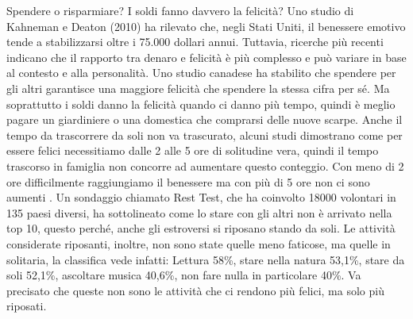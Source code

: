 \documentclass[12pt]{book} %
\begin{document}
\begin{mdframed}[linewidth=1pt]
Spendere o risparmiare? I soldi fanno davvero la felicità? Uno studio di Kahneman e Deaton (2010) ha rilevato che, negli Stati Uniti, il benessere emotivo tende a stabilizzarsi oltre i 75.000 dollari annui. Tuttavia, ricerche più recenti indicano che il rapporto tra denaro e felicità è più complesso e può variare in base al contesto e alla personalità. Uno studio canadese ha stabilito che spendere per gli altri
garantisce una maggiore felicità che spendere la stessa cifra per sé. 
Ma soprattutto i soldi danno la felicità quando ci danno più tempo, quindi è meglio pagare
un giardiniere o una domestica che comprarsi delle nuove scarpe. Anche il tempo da trascorrere da soli non va
trascurato, alcuni studi dimostrano come per essere felici necessitiamo dalle 2 alle 5 ore di solitudine vera, quindi
il tempo trascorso in famiglia non concorre ad aumentare questo conteggio. Con meno di 2 ore difficilmente raggiungiamo
il benessere ma con più di 5 ore non ci sono aumenti
  .
Un sondaggio chiamato Rest Test, che ha coinvolto 18000 volontari in 135 paesi diversi, ha sottolineato come lo stare con gli altri non è arrivato nella top 10, questo perché, anche gli estroversi si riposano stando da soli. Le attività considerate riposanti, inoltre, non sono state quelle meno faticose, ma quelle in solitaria, la classifica vede infatti: Lettura 58\%, stare nella natura 53,1\%, stare da soli 52,1\%, ascoltare musica 40,6\%, non fare nulla in particolare 40\%. Va precisato che queste non sono le attività che ci rendono più felici, ma solo più riposati.


\end{mdframed}
\end{document}
